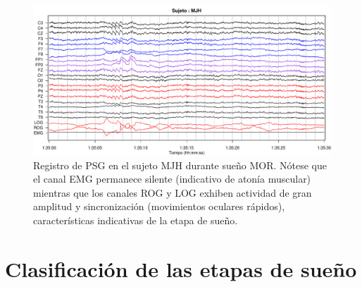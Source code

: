 \documentclass[12pt,a4paper]{mitthesis}
\begin{document}
\begin{figure}
\centering
\includegraphics[width=\linewidth]
{./p_170427/MJH_190_PDG_lucirse_PSG.pdf}
\caption{Registro de PSG en el sujeto MJH durante sue\~no MOR. N\'otese que el canal EMG permanece 
silente (indicativo de aton\'ia muscular) mientras que los canales ROG y LOG exhiben actividad de 
gran amplitud y sincronizaci\'on (movimientos oculares r\'apidos), caracter\'isticas indicativas de
la etapa de sue\~no.}
\label{ejemplos_mor}
\end{figure}


\section{Clasificaci\'on de las etapas de sue\~no}
\end{document}
